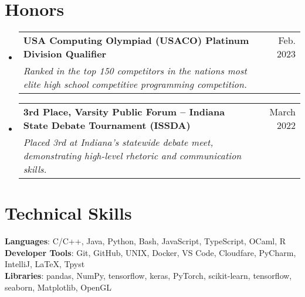 \documentclass[letterpaper,11pt]{article}
\makeatletter
\newcommand{\resumeSubheading}[4]{
  \vspace{-2pt}\item
    \begin{tabular*}{0.97\textwidth}[t]{l@{\extracolsep{\fill}}r}
      \textbf{#1} & #2 \\
      \textit{\small#3} & \textit{\small #4} \\
    \end{tabular*}\vspace{-7pt}
}
\newcommand{\resumeSubHeadingListStart}{\begin{itemize}[leftmargin=0.15in, label={}]}
\newcommand{\resumeSubHeadingListEnd}{\end{itemize}}
\makeatother
\begin{document}
\section{Honors}
    \resumeSubHeadingListStart
    \resumeSubheading
    {USA Computing Olympiad (USACO) Platinum Division Qualifier}{Feb. 2023}
    {Ranked in the top 150 competitors in the nations most elite high school competitive programming competition.}{}
    \resumeSubheading
    {3rd Place, Varsity Public Forum – Indiana State Debate Tournament (ISSDA)}{March 2022}
    {Placed 3rd at Indiana’s statewide debate meet, demonstrating high-level rhetoric and communication skills.}{}
    \resumeSubHeadingListEnd

%
\section{Technical Skills}
 \begin{itemize}[leftmargin=0.15in, label={}]
    \small{\item{
     \textbf{Languages}{: C/C++, Java, Python, Bash, JavaScript, TypeScript, OCaml, R} \\
     \textbf{Developer Tools}{: Git, GitHub, UNIX, Docker, VS Code, Cloudfare, PyCharm, IntelliJ, LaTeX, Tpyst} \\
     \textbf{Libraries}{: pandas, NumPy, tensorflow, keras, PyTorch, scikit-learn, tensorflow, seaborn, Matplotlib, OpenGL}
    }}
 \end{itemize}

\end{document}
